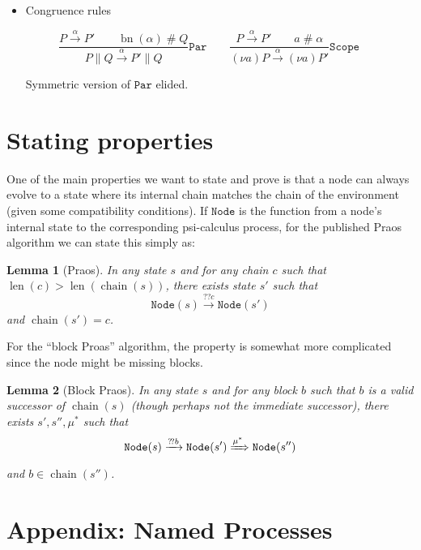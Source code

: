 \documentclass{article}
\newcommand{\bIn}{{?\!?}}
\newcommand{\new}[2]{(\nu\!#1) #2}
\newcommand{\freshFor}{\mathrel{\#}}
\newcommand{\psicalculus}{psi-calculus\xspace}
\newtheorem{lemma}{Lemma}
\DeclareMathOperator{\bn}{bn}
\DeclareMathOperator{\len}{len}
\DeclareMathOperator{\chain}{chain}
\begin{document}
\begin{itemize}
\item Congruence rules

\begin{equation*}
%
%
\frac{
P \xrightarrow{\alpha} P' \qquad
\bn(\alpha) \freshFor Q
}{
P \parallel Q \xrightarrow{\alpha} P' \parallel Q
}
\mathtt{Par}
%
\qquad
%
%
\frac{
P \xrightarrow{\alpha} P' \qquad
a \freshFor \alpha
}{
\new{a}{P} \xrightarrow{\alpha} \new{a}{P'}
}
\mathtt{Scope}
%
\qquad
\end{equation*}

Symmetric version of $\mathtt{Par}$ elided.

\end{itemize}

\section{Stating properties}

\newcommand{\node}{\mathtt{Node}}

One of the main properties we want to state and prove is that a node can always
evolve to a state where its internal chain matches the chain of the environment
(given some compatibility conditions). If $\node$ is the function from a node's
internal state to the corresponding \psicalculus process, for the published
Praos algorithm we can state this simply as:

\begin{lemma}[Praos]
In any state $s$ and for any chain $c$ such that $\len(c) > \len(\chain(s))$,
there exists state $s'$ such that $$\node(s) \xrightarrow{\bIn c} \node(s')$$
and $\chain(s') = c$.
\end{lemma}

For the ``block Proas'' algorithm, the property is somewhat more complicated
since the node might be missing blocks.

\begin{lemma}[Block Praos]
In any state $s$ and for any block $b$ such that $b$ is a valid successor of
$\chain(s)$ (though perhaps not the \emph{immediate} successor), there exists
$s', s'', \mu^*$ such that
$$\node(s) \xrightarrow{\bIn b} \node(s') \xRightarrow{\mu^*} \node(s'')$$
and $b \in \chain(s'')$.
\end{lemma}

\appendix

\section{Appendix: Named Processes}
\label{app:namedproc}
\end{document}
